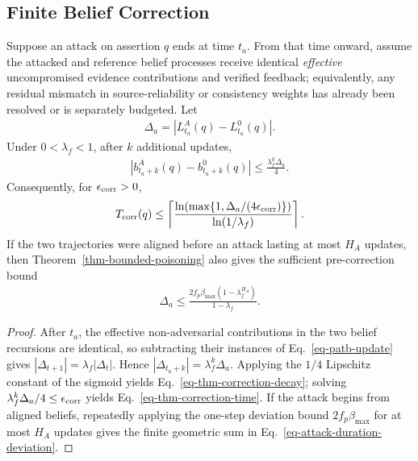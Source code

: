 \subsection{Finite Belief Correction}
\begin{theorem}
\label{thm-finite-correction}
Suppose an attack on assertion $q$ ends at time $t_a$. From that time onward, assume the attacked and reference belief processes receive identical \emph{effective} uncompromised evidence contributions and verified feedback; equivalently, any residual mismatch in source-reliability or consistency weights has already been resolved or is separately budgeted. Let
\begin{align}
\Delta_a=|L_{t_a}^A(q)-L_{t_a}^0(q)|.
\end{align}
Under $0<\lambda_f<1$, after $k$ additional updates,
\begin{align}
\label{eq-thm-correction-decay}
|b_{t_a+k}^A(q)-b_{t_a+k}^0(q)|
\le\frac{\lambda_f^k\Delta_a}{4}.
\end{align}
Consequently, for $\epsilon_{\rm corr}>0$,
\begin{align}
\label{eq-thm-correction-time}
T_{\rm corr}(q)
\le
\left\lceil
\frac{\ln\!\left(\max\{1,\Delta_a/(4\epsilon_{\rm corr})\}\right)}
{\ln(1/\lambda_f)}
\right\rceil.
\end{align}
If the two trajectories were aligned before an attack lasting at most $H_A$ updates, then Theorem~\ref{thm-bounded-poisoning} also gives the sufficient pre-correction bound
\begin{align}
\label{eq-attack-duration-deviation}
\Delta_a\le
\frac{2f_p\beta_{\max}(1-\lambda_f^{H_A})}{1-\lambda_f}.
\end{align}
\end{theorem}

\begin{proof}
After $t_a$, the effective non-adversarial contributions in the two belief recursions are identical, so subtracting their instances of Eq.~\ref{eq-patb-update} gives $|\Delta_{t+1}|=\lambda_f|\Delta_t|$. Hence $|\Delta_{t_a+k}|=\lambda_f^k\Delta_a$. Applying the $1/4$ Lipschitz constant of the sigmoid yields Eq.~\ref{eq-thm-correction-decay}; solving $\lambda_f^k\Delta_a/4\le\epsilon_{\rm corr}$ yields Eq.~\ref{eq-thm-correction-time}. If the attack begins from aligned beliefs, repeatedly applying the one-step deviation bound $2f_p\beta_{\max}$ for at most $H_A$ updates gives the finite geometric sum in Eq.~\ref{eq-attack-duration-deviation}.
\end{proof}

